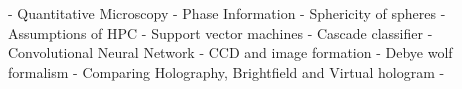 - Quantitative Microscopy
- Phase Information
- Sphericity of spheres
- Assumptions of HPC
- Support vector machines
- Cascade classifier
- Convolutional Neural Network
- CCD and image formation
- Debye wolf formalism
- Comparing Holography, Brightfield and Virtual hologram
- 
